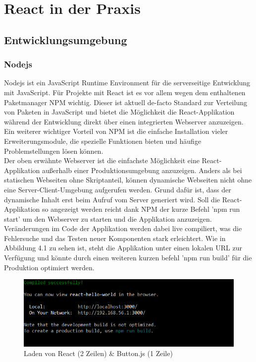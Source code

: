 
\chapter{React in der Praxis}
  \label{React in der Praxis}
\section{Entwicklungsumgebung}
\subsection{Nodejs}
Nodejs ist ein JavaScript Runtime Environment für die serverseitige Entwicklung mit JavaScript. Für Projekte mit React ist es vor allem wegen dem enthaltenen Paketmanager NPM wichtig. Dieser ist aktuell de-facto Standard zur Verteilung von Paketen in JavaScript und bietet die Möglichkeit die React-Applikation während der Entwicklung direkt über einen integrierten Webserver anzuzeigen. Ein weiterer wichtiger Vorteil von NPM ist die einfache Installation vieler Erweiterungsmodule, die spezielle Funktionen bieten und häufige Problemstellungen lösen können. \\
Der oben erwähnte Webserver ist die einfachste Möglichkeit eine React-Applikation außerhalb einer Produktionsumgebung anzuzeigen. Anders als bei statischen Webseiten ohne Skriptanteil, können dynamische Webseiten nicht ohne eine Server-Client-Umgebung aufgerufen werden. Grund dafür ist, dass der dynamische Inhalt erst beim Aufruf vom Server generiert wird. Soll die React-Applikation so angezeigt werden reicht dank NPM der kurze Befehl 'npm run start' um den Webserver zu starten und die Applikation anzuzeigen. Veränderungen im Code der Applikation werden dabei live compiliert, was die Fehlersuche und das Testen neuer Komponenten stark erleichtert. Wie in Abbildung 4.1 zu sehen ist, steht die Applikation unter einen lokalen URL zur Verfügung und könnte durch einen weiteren kurzen befehl 'npm run build' für die Produktion optimiert werden.
\begin{figure}[H]
     \centerline{\includegraphics[width=14cm]{../Abbildungen/npmRunStart.png}}
  \caption{Laden von React (2 Zeilen) \& Button.js (1 Zeile)}
  \label{NPM Dialog}
\end{figure}
